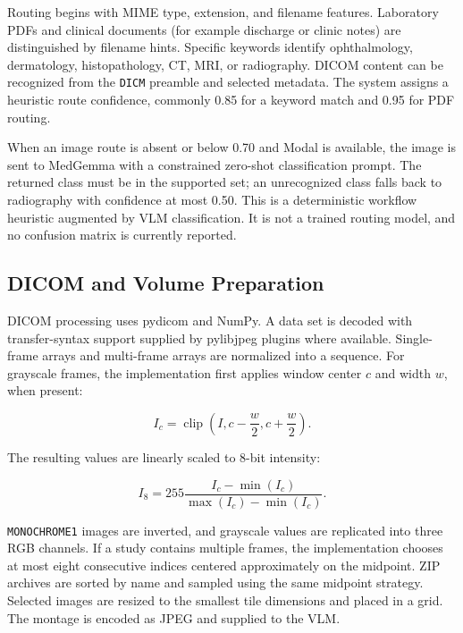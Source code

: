 \documentclass[conference]{IEEEtran}
\begin{document}
Routing begins with MIME type, extension, and filename features. Laboratory PDFs and clinical documents (for example discharge or clinic notes) are distinguished by filename hints. Specific keywords identify ophthalmology, dermatology, histopathology, CT, MRI, or radiography. DICOM content can be recognized from the \texttt{DICM} preamble and selected metadata. The system assigns a heuristic route confidence, commonly 0.85 for a keyword match and 0.95 for PDF routing.

When an image route is absent or below 0.70 and Modal is available, the image is sent to MedGemma with a constrained zero-shot classification prompt. The returned class must be in the supported set; an unrecognized class falls back to radiography with confidence at most 0.50. This is a deterministic workflow heuristic augmented by VLM classification. It is not a trained routing model, and no confusion matrix is currently reported.

\subsection{DICOM and Volume Preparation}

DICOM processing uses pydicom and NumPy. A data set is decoded with transfer-syntax support supplied by pylibjpeg plugins where available. Single-frame arrays and multi-frame arrays are normalized into a sequence. For grayscale frames, the implementation first applies window center \(c\) and width \(w\), when present:

\begin{equation}
  I_c = \operatorname{clip}\left(I, c-\frac{w}{2}, c+\frac{w}{2}\right).
\end{equation}

The resulting values are linearly scaled to 8-bit intensity:

\begin{equation}
  I_8 = 255\frac{I_c-\min(I_c)}{\max(I_c)-\min(I_c)}.
\end{equation}

\texttt{MONOCHROME1} images are inverted, and grayscale values are replicated into three RGB channels. If a study contains multiple frames, the implementation chooses at most eight consecutive indices centered approximately on the midpoint. ZIP archives are sorted by name and sampled using the same midpoint strategy. Selected images are resized to the smallest tile dimensions and placed in a grid. The montage is encoded as JPEG and supplied to the VLM.
\end{document}

